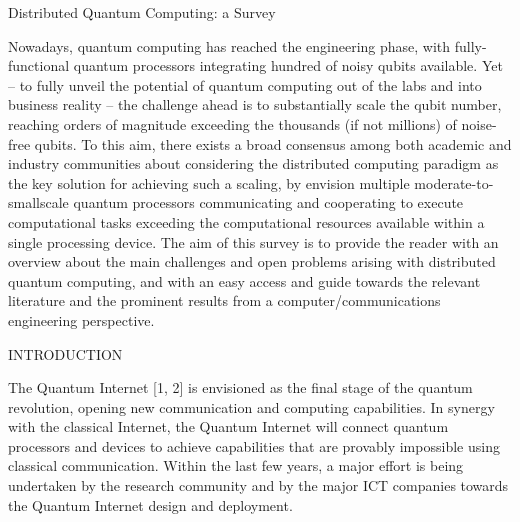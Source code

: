 Distributed Quantum Computing: a Survey

Nowadays, quantum computing has reached the engineering phase, with fully-functional quantum processors integrating hundred of noisy qubits available. Yet – to fully unveil the potential of quantum computing out of the labs and into business reality – the challenge ahead is to substantially scale the qubit number, reaching orders of magnitude exceeding the thousands (if not millions) of noise-free qubits. To this aim, there exists a broad consensus among both academic and industry communities about considering the distributed computing paradigm as the key solution for achieving such a scaling, by envision multiple moderate-to-smallscale quantum processors communicating and cooperating to execute computational tasks exceeding the computational resources available within a single processing device. The aim of this survey is to provide the reader with an overview about the main challenges and open problems arising with distributed quantum computing, and with an easy access and guide towards the relevant literature and the prominent results from a computer/communications engineering perspective.

INTRODUCTION 

The Quantum Internet [1, 2] is envisioned as the final stage of the quantum revolution, opening new communication and computing capabilities. In synergy with the classical Internet, the Quantum Internet will connect quantum processors and devices to achieve capabilities that are provably impossible using classical communication. Within the last few years, a major effort is being undertaken by the research community and by the major ICT companies towards the Quantum Internet design and deployment.


